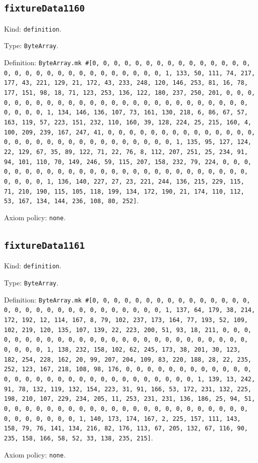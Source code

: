 \documentclass[11pt]{article}
\begin{document}
\subsection*{\texttt{fixtureData1160}}
\noindent Kind: \texttt{definition}.\par
\noindent Type: \texttt{ByteArray}.\par
\noindent Definition: \texttt{ByteArray.mk \#[0, 0, 0, 0, 0, 0, 0, 0, 0, 0, 0, 0, 0, 0, 0, 0, 0, 0, 0, 0, 0, 0, 0, 0, 0, 0, 0, 0, 0, 0, 1, 133, 50, 111, 74, 217, 177, 43, 221, 129, 21, 172, 43, 233, 248, 120, 146, 253, 81, 16, 78, 177, 151, 98, 18, 71, 123, 253, 136, 122, 180, 237, 250, 201, 0, 0, 0, 0, 0, 0, 0, 0, 0, 0, 0, 0, 0, 0, 0, 0, 0, 0, 0, 0, 0, 0, 0, 0, 0, 0, 0, 0, 0, 0, 1, 134, 146, 136, 107, 73, 161, 130, 218, 6, 86, 67, 57, 163, 119, 57, 223, 151, 232, 110, 160, 39, 128, 224, 25, 215, 160, 4, 100, 209, 239, 167, 247, 41, 0, 0, 0, 0, 0, 0, 0, 0, 0, 0, 0, 0, 0, 0, 0, 0, 0, 0, 0, 0, 0, 0, 0, 0, 0, 0, 0, 0, 0, 0, 1, 135, 95, 127, 124, 22, 129, 67, 35, 89, 122, 71, 22, 76, 8, 112, 207, 251, 25, 234, 91, 94, 101, 110, 70, 149, 246, 59, 115, 207, 158, 232, 79, 224, 0, 0, 0, 0, 0, 0, 0, 0, 0, 0, 0, 0, 0, 0, 0, 0, 0, 0, 0, 0, 0, 0, 0, 0, 0, 0, 0, 0, 0, 0, 1, 136, 140, 227, 27, 23, 221, 244, 136, 215, 229, 115, 71, 210, 190, 115, 105, 118, 199, 134, 172, 190, 21, 174, 110, 112, 53, 167, 134, 144, 236, 108, 80, 252]}.\par
\noindent Axiom policy: \texttt{none}.\par
\subsection*{\texttt{fixtureData1161}}
\noindent Kind: \texttt{definition}.\par
\noindent Type: \texttt{ByteArray}.\par
\noindent Definition: \texttt{ByteArray.mk \#[0, 0, 0, 0, 0, 0, 0, 0, 0, 0, 0, 0, 0, 0, 0, 0, 0, 0, 0, 0, 0, 0, 0, 0, 0, 0, 0, 0, 0, 0, 1, 137, 64, 179, 38, 214, 172, 192, 12, 114, 167, 8, 79, 102, 237, 173, 164, 77, 193, 52, 109, 102, 219, 120, 135, 107, 139, 22, 223, 200, 51, 93, 18, 211, 0, 0, 0, 0, 0, 0, 0, 0, 0, 0, 0, 0, 0, 0, 0, 0, 0, 0, 0, 0, 0, 0, 0, 0, 0, 0, 0, 0, 0, 0, 1, 138, 232, 158, 102, 62, 245, 173, 38, 201, 30, 123, 182, 254, 228, 162, 20, 99, 207, 204, 109, 83, 220, 188, 28, 22, 235, 252, 123, 167, 218, 108, 98, 176, 0, 0, 0, 0, 0, 0, 0, 0, 0, 0, 0, 0, 0, 0, 0, 0, 0, 0, 0, 0, 0, 0, 0, 0, 0, 0, 0, 0, 0, 0, 1, 139, 13, 242, 91, 78, 132, 119, 132, 154, 223, 31, 91, 166, 53, 172, 231, 132, 225, 198, 210, 107, 229, 234, 205, 11, 253, 231, 231, 136, 186, 25, 94, 51, 0, 0, 0, 0, 0, 0, 0, 0, 0, 0, 0, 0, 0, 0, 0, 0, 0, 0, 0, 0, 0, 0, 0, 0, 0, 0, 0, 0, 0, 0, 1, 140, 173, 174, 167, 2, 225, 157, 111, 143, 158, 79, 76, 141, 134, 216, 82, 176, 113, 67, 205, 132, 67, 116, 90, 235, 158, 166, 58, 52, 33, 138, 235, 215]}.\par
\noindent Axiom policy: \texttt{none}.\par
\end{document}
